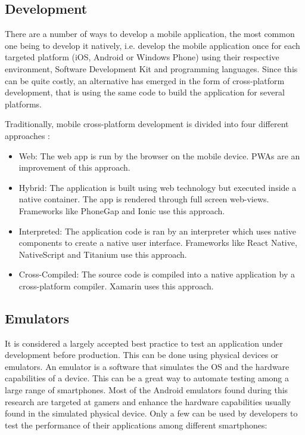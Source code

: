 \documentclass{kththesis}
\begin{document}
\subsection{Development}
There are a number of ways to develop a mobile application, the most common one being to develop it natively, i.e. develop the mobile application once for each targeted platform (iOS, Android or Windows Phone) using their respective environment, Software Development Kit and programming languages. Since this can be quite costly, an alternative has emerged in the form of cross-platform development, that is using the same code to build the application for several platforms.

Traditionally, mobile cross-platform development is divided into four different approaches \cite{CrossPlatform_dev}:
\begin{itemize}
    \item Web: The web app is run by the browser on the mobile device. PWAs are an improvement of this approach.
    \item Hybrid: The application is built using web technology but executed inside a native container. The app is rendered through full screen web-views. Frameworks like PhoneGap and Ionic \cite{crossplatform_approaches} use this approach.
    \item Interpreted: The application code is ran by an interpreter which uses native components to create a native user interface. Frameworks like React Native, NativeScript and Titanium \cite{emulating_native_w_crossplatform} use this approach.
    \item Cross-Compiled: The source code is compiled into a native application by a cross-platform compiler. Xamarin \cite{crossplatform_approaches} uses this approach. 
\end{itemize}


\subsection{Emulators}
    It is considered a largely accepted best practice to test an application under development before production. This can be done using physical devices or emulators. An emulator is a software that simulates the OS and the hardware capabilities of a device\cite{emulator_def}. This can be a great way to automate testing among a large range of smartphones. Most of the Android emulators found during this research are targeted at gamers and enhance the hardware capabilities usually found in the simulated physical device. Only a few can be used by developers to test the performance of their applications among different smartphones:
    
\end{document}
